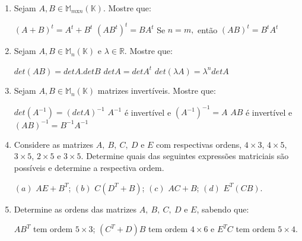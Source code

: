\documentclass{report}
\begin{document}
\begin{Exercise}

\begin{enumerate}

\item Sejam $A,B\in \mathbb{M}_{m\textrm{x}n}(\mathbb{K}).$ Mostre que:
\begin{tasks}
\task $(A+B)^{t}=A^{t}+B^{t}$
\task $(AB^{t})^{t}=BA^{t}$
\task Se $n=m,$ então $(AB)^{t}=B^{t}A^{t}$
\end{tasks} 

\item Sejam $A,B\in \mathbb{M}_{n}(\mathbb{K})$ e $\lambda\in \mathbb{R}.$ Mostre que:
\begin{tasks}
\task $det(AB)=detA.detB$
\task $det A=detA^{t}$
\task $det(\lambda A)=\lambda^{n}detA$
\end{tasks} 

\item Sejam $A,B\in \mathbb{M}_{n}(\mathbb{K})$ matrizes invertíveis. Mostre que:
\begin{tasks}
\task $det(A^{-1})=(detA)^{-1}$
\task $A^{-1}$ é invertível e $(A^{-1})^{-1}=A$
\task $AB$ é invertível e $(AB)^{-1}=B^{-1}A^{-1}$
\end{tasks} 







\item \label{1lista1} Considere as matrizes $A, \ B, \ C, \ D
\textrm{ e } E$ com respectivas ordens, $4\times 3$, $4 \times 5$,
$3 \times 5$, $2 \times 5$ e $3 \times 5$. Determine quais das
seguintes expressões matriciais são possíveis e determine a
respectiva ordem.

$(a)$ $AE +B^T$; \hspace{1.4cm} $(b)$ $C(D^T +B)$;\hspace{1.4cm}
$(c)$ $AC+B$; \hspace{1.4cm} $(d)$ $E^T(CB)$.


\item \label{1lista2} Determine as ordens das matrizes $A, \ B, \
C, \ D \textrm{ e } E$, sabendo que:

$AB^T$ tem ordem $5 \times 3$; \hspace{0.5cm} $(C^T+D)B$ tem ordem
$4 \times 6$ e \hspace{0.5cm} $E^TC$ tem ordem $5 \times 4$.


\end{enumerate}
\end{Exercise}
\end{document}

